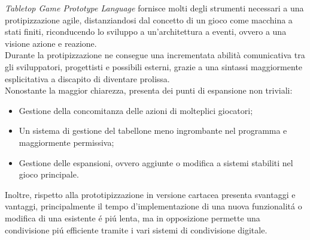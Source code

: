 \textit{Tabletop Game Prototype Language} fornisce molti degli strumenti necessari 
a una protipizzazione agile, distanziandosi dal concetto di un gioco come macchina 
a stati finiti, riconducendo lo sviluppo a un'architettura a eventi, ovvero 
a una visione azione e reazione. \\
Durante la protipizzazione ne consegue una incrementata abilità comunicativa tra 
gli sviluppatori, progettisti e possibili esterni, grazie a una sintassi maggiormente
esplicitativa a discapito di diventare prolissa. \\
Nonostante la maggior chiarezza, presenta dei punti di espansione non triviali:
\begin{itemize}
    \item Gestione della concomitanza delle azioni di molteplici giocatori;
    \item { 
        Un sistema di gestione del tabellone meno ingrombante nel programma e
        maggiormente permissiva;
    }
    \item {
        Gestione delle espansioni, ovvero aggiunte o modifica a sistemi stabiliti
        nel gioco principale.
    }
\end{itemize}
Inoltre, rispetto alla prototipizzazione in versione cartacea presenta svantaggi
e vantaggi, principalmente il tempo d'implementazione di una nuova funzionalitá o
modifica di una esistente é piú lenta, ma in opposizione permette 
una condivisione piú efficiente tramite i vari sistemi di condivisione digitale.
